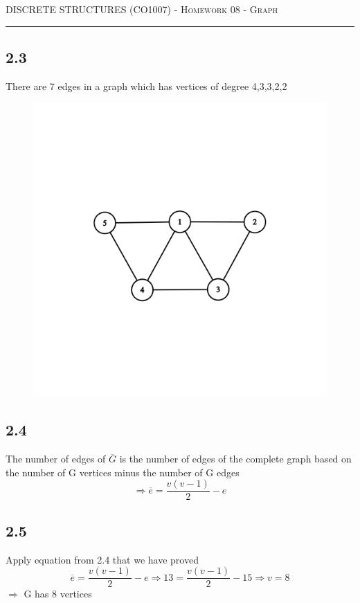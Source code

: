 \documentclass{article}
\begin{document}
{\scshape } \hfill {\scshape DISCRETE STRUCTURES (CO1007) - Homework 08 - Graph} \hfill {\scshape }
 
\smallskip

\hrule

\bigskip

\bigskip 
\subsection*{2.3}
There are 7 edges in a graph which has vertices of degree 4,3,3,2,2
\begin{figure}[h]
\includegraphics[scale = 0.4]{problem_2/graph_2.3.png}
\end{figure}

\subsection*{2.4}
The number of edges of $\overline{G}$ is the number of edges of the complete graph based on the number of G vertices minus the number of G edges
$$ \Rightarrow \overline{e} = \frac{v(v - 1)}{2} - e $$

\subsection*{2.5}
Apply equation from 2.4 that we have proved
$$ \overline{e} = \frac{v(v - 1)}{2} - e \Rightarrow 13 = \frac{v(v - 1)}{2} - 15 \Rightarrow v = 8 $$
$ \Rightarrow $ G has 8 vertices
\newpage
\end{document}
